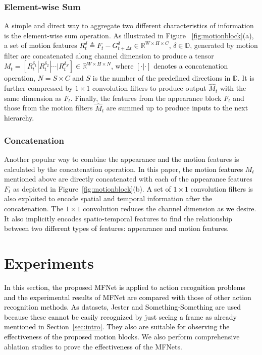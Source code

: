 \documentclass[runningheads]{llncs}
\newcommand{\nj}[1]{\textcolor{black}{#1}}
\begin{document}
\subsubsection*{Element-wise Sum}
A simple and direct way to aggregate two different \nj{characteristics} of information is the element-wise sum operation. As illustrated in Figure ~\ref{fig:motionblock}(a), a set of \nj{motion features $R_{t}^\delta \triangleq F_t - G_{t+\Delta t}^{\delta} \in \mathbb{R}^{W\times{H}\times{C}}$, $\delta \in \mathbb{D}$}, generated by motion filter are concatenated along channel dimension \nj{to produce} a tensor \nj{${M}_{t} = [R^{\delta_1}_t | R^{\delta_2}_t | \cdots | R^{\delta_S}_t] \in{\mathbb{R}^{W\times{H}\times{N}}}$, where $[\cdot|\cdot]$ denotes a concatenation operation, $N = S \times C$ and $S$ is the number of the predefined directions in $\mathbb{D}$.} It is further compressed by $1 \times 1$ convolution filters to produce output $\hat{M}_t$ with the same dimension as $F_{t}$. Finally, the features from the appearance block $F_{t}$ and those from the motion filters $\hat{M}_t$ are summed up \nj{to produce inputs to the next hierarchy.}

\subsubsection*{Concatenation}
Another popular way to combine the \nj{appearance and the motion} features is calculated by the concatenation operation. In this paper, \nj{the motion features $M_{t}$} mentioned above are directly concatenated with each of the \nj{appearance} features $F_{t}$ as depicted in Figure~\ref{fig:motionblock}(b). \nj{A set of $1 \times 1$ convolution filters} is  also exploited to encode spatial and temporal information \nj{after the concatenation}. The $1 \times 1$ convolution reduces the channel dimension \nj{as we desire.}
It also implicitly encodes spatio-temporal features to find the relationship between two \nj{different types of features: appearance and motion features.} 

\section{Experiments}
\label{sec:exp}
\nj{In this section, the proposed MFNet is applied to action recognition problems and the experimental results of MFNet are compared with those of other action recognition methods. As datasets, Jester \cite{dataset_jester} and Something-Something \cite{goyal2017something} are used because these cannot be easily recognized by just seeing a frame as already mentioned in Section~\ref{sec:intro}. \nj{They also are} suitable \nj{for observing} the effectiveness of the proposed motion blocks. 
}
We \nj{also} perform comprehensive ablation studies to prove the \nj{effectiveness} of the MFNets.
\end{document}
